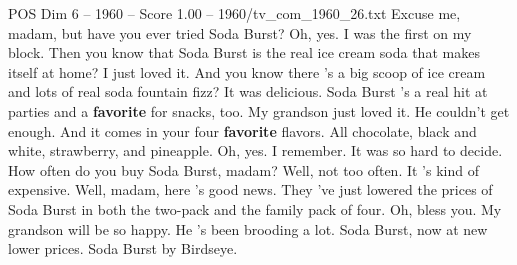 \begin{textsample}{POS Dim 6 – 1960 – Score 1.00 – 1960/tv\_com\_1960\_26.txt}  \label{ex:f6_pos_024}
Excuse me, madam, but have you ever tried Soda Burst?
Oh, yes.
I was the first on my block.
Then you know that Soda Burst is the real ice cream soda that makes itself at home?
I just loved it.
And you know there 's a big scoop of ice cream and lots of real soda fountain fizz?
It was delicious.
Soda Burst 's a real hit at parties and a \textbf{favorite} for snacks, too.
My grandson just loved it.
He couldn't get enough.
And it comes in your four \textbf{favorite} flavors.
All chocolate, black and white, strawberry, and pineapple.
Oh, yes.
I remember.
It was so hard to decide.
How often do you buy Soda Burst, madam?
Well, not too often.
It 's kind of expensive.
Well, madam, here 's good news.
They 've just lowered the prices of Soda Burst in both the two-pack and the family pack of four.
Oh, bless you.
My grandson will be so happy.
He 's been brooding a lot.
Soda Burst, now at new lower prices.
Soda Burst by Birdseye.

\end{textsample}
